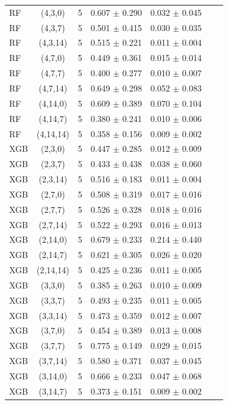 \begin{longtable}{lcccccc}
RF & (4,3,0) & 5 & 0.607 $\pm$ 0.290 & 0.032 $\pm$ 0.045 \\
RF & (4,3,7) & 5 & 0.501 $\pm$ 0.415 & 0.030 $\pm$ 0.035 \\
RF & (4,3,14) & 5 & 0.515 $\pm$ 0.221 & 0.011 $\pm$ 0.004 \\
RF & (4,7,0) & 5 & 0.449 $\pm$ 0.361 & 0.015 $\pm$ 0.014 \\
RF & (4,7,7) & 5 & 0.400 $\pm$ 0.277 & 0.010 $\pm$ 0.007 \\
RF & (4,7,14) & 5 & 0.649 $\pm$ 0.298 & 0.052 $\pm$ 0.083 \\
RF & (4,14,0) & 5 & 0.609 $\pm$ 0.389 & 0.070 $\pm$ 0.104 \\
RF & (4,14,7) & 5 & 0.380 $\pm$ 0.241 & 0.010 $\pm$ 0.006 \\
RF & (4,14,14) & 5 & 0.358 $\pm$ 0.156 & 0.009 $\pm$ 0.002 \\
XGB & (2,3,0) & 5 & 0.447 $\pm$ 0.285 & 0.012 $\pm$ 0.009 \\
XGB & (2,3,7) & 5 & 0.433 $\pm$ 0.438 & 0.038 $\pm$ 0.060 \\
XGB & (2,3,14) & 5 & 0.516 $\pm$ 0.183 & 0.011 $\pm$ 0.004 \\
XGB & (2,7,0) & 5 & 0.508 $\pm$ 0.319 & 0.017 $\pm$ 0.016 \\
XGB & (2,7,7) & 5 & 0.526 $\pm$ 0.328 & 0.018 $\pm$ 0.016 \\
XGB & (2,7,14) & 5 & 0.522 $\pm$ 0.293 & 0.016 $\pm$ 0.013 \\
XGB & (2,14,0) & 5 & 0.679 $\pm$ 0.233 & 0.214 $\pm$ 0.440 \\
XGB & (2,14,7) & 5 & 0.621 $\pm$ 0.305 & 0.026 $\pm$ 0.020 \\
XGB & (2,14,14) & 5 & 0.425 $\pm$ 0.236 & 0.011 $\pm$ 0.005 \\
XGB & (3,3,0) & 5 & 0.385 $\pm$ 0.263 & 0.010 $\pm$ 0.009 \\
XGB & (3,3,7) & 5 & 0.493 $\pm$ 0.235 & 0.011 $\pm$ 0.005 \\
XGB & (3,3,14) & 5 & 0.473 $\pm$ 0.359 & 0.012 $\pm$ 0.007 \\
XGB & (3,7,0) & 5 & 0.454 $\pm$ 0.389 & 0.013 $\pm$ 0.008 \\
XGB & (3,7,7) & 5 & 0.775 $\pm$ 0.149 & 0.029 $\pm$ 0.015 \\
XGB & (3,7,14) & 5 & 0.580 $\pm$ 0.371 & 0.037 $\pm$ 0.045 \\
XGB & (3,14,0) & 5 & 0.666 $\pm$ 0.233 & 0.047 $\pm$ 0.068 \\
XGB & (3,14,7) & 5 & 0.373 $\pm$ 0.151 & 0.009 $\pm$ 0.002 \\

\end{longtable}
